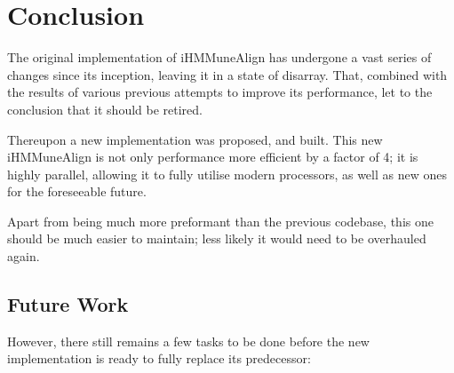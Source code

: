 \chapter{Conclusion}\label{ch:conclusion}

The original implementation of iHMMuneAlign has undergone a vast series of changes since its inception, leaving it in a state of disarray. That, combined with the results of various previous attempts to improve its performance, let to the conclusion that it should be retired. 

Thereupon a new implementation was proposed, and built. This new iHMMuneAlign is not only performance more efficient by a factor of 4; it is highly parallel, allowing it to fully utilise modern processors, as well as new ones for the foreseeable future.

Apart from being much more preformant than the previous codebase, this one should be much easier to maintain; less likely it would need to be overhauled again.

\section{Future Work}

However, there still remains a few tasks to be done before the new implementation is ready to fully replace its predecessor:


